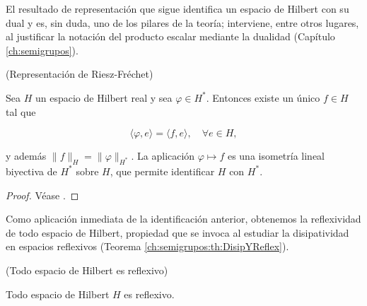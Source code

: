 El resultado de representación que sigue identifica un espacio de Hilbert con su
dual y es, sin duda, uno de los pilares de la teoría; interviene, entre otros
lugares, al justificar la notación del producto escalar mediante la dualidad
(Capítulo \ref{ch:semigrupos}).\\

\begin{Teorema}{(Representación de Riesz-Fréchet)}
\label{ch:preliminares:th:rieszFrechet}

Sea $H$ un espacio de Hilbert real y sea $\varphi \in H^*$. Entonces existe un
único $f \in H$ tal que

\[\langle \varphi, e \rangle = \langle f, e \rangle, \quad \forall e \in H,\]

y además $\lVert f \rVert_H = \lVert \varphi \rVert_{H^*}$. La aplicación
$\varphi \mapsto f$ es una isometría lineal biyectiva de $H^*$ sobre $H$, que
permite identificar $H$ con $H^*$.
\end{Teorema}

\begin{proof}
Véase \cite[Teorema~5.5]{brezis-2011-fun-ana-sob}.
\end{proof}

Como aplicación inmediata de la identificación anterior, obtenemos la
reflexividad de todo espacio de Hilbert, propiedad que se invoca al estudiar la
disipatividad en espacios reflexivos
(Teorema \ref{ch:semigrupos:th:DisipYReflex}).\\

\begin{Teorema}{(Todo espacio de Hilbert es reflexivo)}
\label{ch:preliminares:th:hilbertReflexivo}

Todo espacio de Hilbert $H$ es reflexivo.
\end{Teorema}

